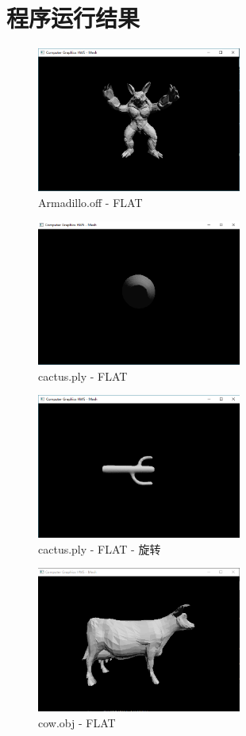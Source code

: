 \documentclass[hyperref, UTF8]{ctexart}
\begin{document}
	\section{程序运行结果}
	\begin{figure}[H]
		\centering
		\includegraphics[width=0.6\textwidth]{../results/armadillo.png}
		\caption{Armadillo.off - FLAT}
	\end{figure}
	\begin{figure}[H]
		\centering
		\includegraphics[width=0.6\textwidth]{../results/cactus_1.png}
		\caption{cactus.ply - FLAT}
	\end{figure}
	\begin{figure}[H]
		\centering
		\includegraphics[width=0.6\textwidth]{../results/cactus_2.png}
		\caption{cactus.ply - FLAT - 旋转}
	\end{figure}
	\begin{figure}[H]
		\centering
		\includegraphics[width=0.6\textwidth]{../results/cow_1.png}
		\caption{cow.obj - FLAT}
	\end{figure}
\end{document}
